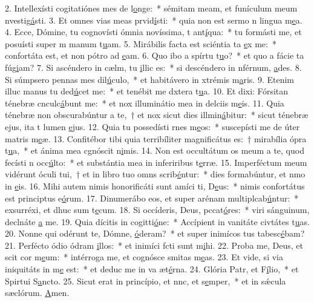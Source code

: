 2. Intellexísti cogitatiónes mes de l\uline{o}nge:~* sémitam meam, et funículum meum nvestig\uline{á}sti.
3. Et omnes vias meas prvid\uline{í}sti:~* quia non est sermo n lingua m\uline{e}a.
4. Ecce, Dómine, tu cognovísti ómnia novíssima, t ant\uline{í}qua:~* tu formásti me, et posuísti super m manum t\uline{u}am.
5. Mirábilis facta est sciéntia ta \uline{e}x me:~* confortáta est, et non pótro ad \uline{e}am.
6. Quo ibo a spírtu t\uline{u}o?~* et quo a fácie ta fúg\uline{i}am?
7. Si ascéndero in cælm, tu \uline{i}llic es:~* si descéndero in nférnum, \uline{a}des.
8. Si súmpsero pennas mes dil\uline{ú}culo,~* et habitávero in xtrémis m\uline{a}ris.
9. Etenim illuc manus tu ded\uline{ú}cet me:~* et tenébit me dxtera t\uline{u}a.
10. Et dixi: Fórsitan ténebræ cnculc\uline{á}bunt me:~* et nox illuminátio mea in delciis m\uline{e}is.
11. Quia ténebræ non obscurabúntur a te,~† et nox sicut dies illmin\uline{á}bitur:~* sicut ténebræ ejus, ita t lumen \uline{e}jus.
12. Quia tu possedísti rnes m\uline{e}os:~* suscepísti me de úter matris m\uline{e}æ.
13. Confitébor tibi quia terribíliter magnificátus es:~† mirabília ópra t\uline{u}a,~* et ánima mea cgnóscit n\uline{i}mis.
14. Non est occultátum os meum a te, quod fecísti n occ\uline{ú}lto:~* et substántia mea in inferiribus t\uline{e}rræ.
15. Imperféctum meum vidérunt óculi tui,~† et in libro tuo omns scrib\uline{é}ntur:~* dies formabúntur, et nmo in \uline{e}is.
16. Mihi autem nimis honorificáti sunt amíci ti, D\uline{e}us:~* nimis confortátus est principtus e\uline{ó}rum.
17. Dinumerábo eos, et super arénam multiplcab\uline{ú}ntur:~* exsurréxi, et dhuc sum t\uline{e}cum.
18. Si occíderis, Deus, pccat\uline{ó}res:~* viri sánguinum, declnáte \uline{a} me.
19. Quia dícitis in cogitti\uline{ó}ne:~* Accípient in vanitáte civtátes t\uline{u}as.
20. Nonne qui odérunt te, Dómne, \uline{ó}deram?~* et super inimícos tus tabesc\uline{é}bam?
21. Perfécto ódio ódram \uline{i}llos:~* et inimíci fcti sunt m\uline{i}hi.
22. Proba me, Deus, et scit cor m\uline{e}um:~* intérroga me, et cognósce smitas m\uline{e}as.
23. Et vide, si via iniquitáts in m\uline{e} est:~* et deduc me in va æt\uline{é}rna.
24. Glória Patr, et F\uline{í}lio,~* et Spirtui S\uline{a}ncto.
25. Sicut erat in princípio, et nnc, et s\uline{e}mper,~* et in sǽcula sæclórum. \uline{A}men.

